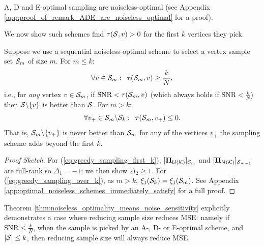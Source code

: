     
\begin{remark}
\label{remark:ADE_are_noiseless_optimal}
     A, D and E-optimal sampling are noiseless-optimal (see Appendix \ref{app:proof_of_remark_ADE_are_noiseless_optimal} for a proof). \end{remark} 
     
We now show such schemes find $\tau(\mathcal{S},v) > 0$ for the first $k$ vertices they pick.
   
\begin{theorem}
\label{thm:noiseless_optimality_means_noise_sensitivity}
    Suppose we use a sequential noiseless-optimal scheme to select a vertex sample set $\mathcal{S}_{m}$ of size $m$. For $m \leq k$:
    \begin{equation}
    \label{eq:greedy_sampling_first_k}
        \forall v \in \mathcal{S}_{m}: \enskip \tau(\mathcal{S}_{m},v) \geq \frac{k}{N},
    \end{equation}
    i.e., for \emph{any} vertex $v \in \mathcal{S}_{m}$, if $\text{SNR} < \tau(\mathcal{S}_{m},v)$ (which always holds if $\text{SNR} < \frac{k}{N}$) then $\mathcal{S} \backslash \{v\}$ is better than $\mathcal{S}$. For $m > k$:
    \begin{equation}
        \label{eq:greedy_sampling_over_k}
        \forall v_{+} \in \mathcal{S}_{m} \backslash \mathcal{S}_{k}: \enskip \tau(\mathcal{S}_{m},v_{+}) \leq 0.
    \end{equation}
    That is, $\mathcal{S}_{m}\backslash \{v_{+}\}$ is never better than $\mathcal{S}_{m}$ for any of the vertices $v_{+}$ the sampling scheme adds beyond the first $k$.
\end{theorem}



\begin{proof}[Proof Sketch]
For (\ref{eq:greedy_sampling_first_k}), $\projblgen[\set{S}_{m}]$ and $\projblgen[\set{S}_{m-1}]$ are full-rank so $\Delta_{1} = -1$; we then show $\Delta_{2} \geq 1$. For (\ref{eq:greedy_sampling_over_k}), as $m>k$, $\xi_{1}(\mathcal{S}_{k}) = \xi_{1}(\mathcal{S}_{m})$. See Appendix \ref{app:optimal_noiseless_schemes_immediately_satisfy} for a full proof.
\end{proof}

 Theorem \ref{thm:noiseless_optimality_means_noise_sensitivity} explicitly demonstrates a case where reducing sample size reduces MSE: namely if $\text{SNR} \leq \frac{k}{N}$, when the sample is picked by an A-, D- or E-optimal scheme, and $|\mathcal{S}| \leq k$, then reducing sample size will always reduce MSE.

